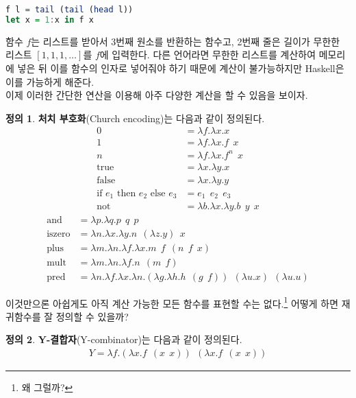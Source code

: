 \documentclass[b5paper, 11pt]{book}
\theoremstyle{definition}
\newtheorem{defn}{정의}[chapter]
\begin{document}
\begin{lstlisting}[language=Haskell]
f l = tail (tail (head l))
let x = 1:x in f x
\end{lstlisting}
함수 $f$는 리스트를 받아서 3번째 원소를 반환하는 함수고, 2번째 줄은 길이가 무한한 리스트 $[1, 1, 1, \ldots]$를 $f$에 입력한다. 다른 언어라면 무한한 리스트를 계산하여 메모리에 넣은 뒤 이를 함수의 인자로 넣어줘야 하기 때문에 계산이 불가능하지만 Haskell은 이를 가능하게 해준다. \\
이제 이러한 간단한 연산을 이용해 아주 다양한 계산을 할 수 있음을 보이자.
\begin{defn}
    \textbf{처치 부호화}(Church encoding)는 다음과 같이 정의된다.
    \begin{align*}
        0 &= \lambda f. \lambda x. x \\ 
        1 &= \lambda f. \lambda x. f \;\, x  \\ 
        n &= \lambda f. \lambda x. f^n \;\, x \\
        \text{true} &= \lambda x. \lambda y. x \\ 
        \text{false} &= \lambda x. \lambda y. y \\ 
        \text{if } e_1 \text{ then } e_2 \text { else } e_3 &=
        e_1 \;\, e_2 \;\, e_3 \\ 
        \text{not} &= \lambda b. \lambda x. \lambda y. b \;\, y \;\, x 
    \end{align*}
    \begin{align*}
        \text{and} &= \lambda p. \lambda q. p \;\, q \;\, p\\
        \text{iszero} &= \lambda n. \lambda x. \lambda y. n \;\, (\lambda z. y) \;\, x \\
        \text{plus} &= \lambda m. \lambda n. \lambda f. \lambda x. m \;\, f \;\, (n\;\, f\;\, x) \\
        \text{mult} &= \lambda m. \lambda n. \lambda f. n \;\, (m \;\, f)  \\ 
        \text{pred} &= \lambda n. \lambda f. \lambda x. \lambda n. (\lambda g. \lambda h.
        h \;\, (g \;\, f)) \;\, (\lambda u. x) \;\, (\lambda u. u)
    \end{align*}
\end{defn}
이것만으론 아쉽게도 아직 계산 가능한 모든 함수를 표현할 수는 없다.\footnote{왜 그럴까?} 어떻게 하면 재귀함수를 잘 정의할 수 있을까? 
\begin{defn}
    \textbf{Y-결합자}(Y-combinator)는 다음과 같이 정의된다.
    \begin{align*}
        Y = \lambda f.(\lambda x. f \;\, (x\;\, x)) \;\, (\lambda x. f \;\, (x \;\, x))
    \end{align*}
\end{defn}
\end{document}
